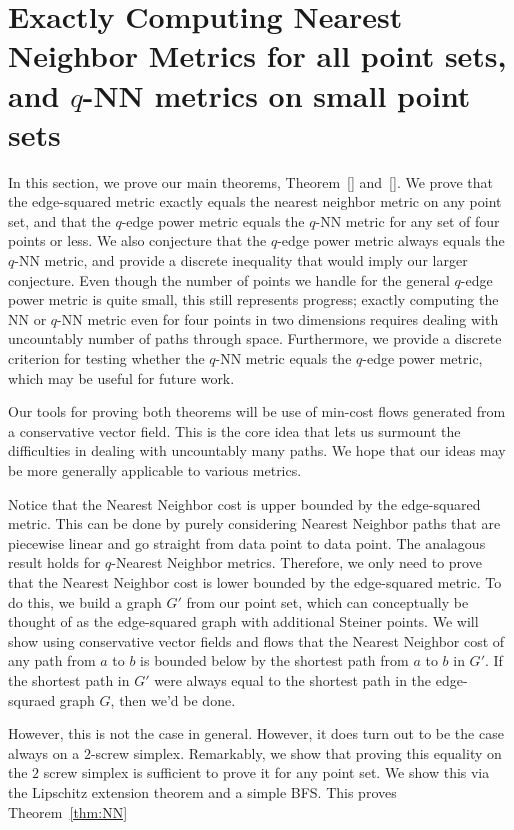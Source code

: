 \section{Exactly Computing Nearest Neighbor Metrics for all point sets, and $q$-NN metrics on
small point sets}\label{sec:metric-equality}

In this section, we prove our main theorems, Theorem~\ref{} and~\ref{}.
We prove that the edge-squared metric exactly equals the nearest neighbor
metric on any point set, and that the $q$-edge power metric equals the $q$-NN
metric for any set of four points or less. We also conjecture that the $q$-edge
power metric always equals the $q$-NN metric, and provide a discrete
inequality that would imply our larger conjecture. Even though the number of points
we handle for the general $q$-edge power metric is quite small, this still
represents progress; exactly computing the NN or $q$-NN metric even for four
points in two dimensions requires dealing with uncountably number of paths
through space. Furthermore, we provide a discrete criterion for testing whether
the $q$-NN metric equals the $q$-edge power metric, which may be useful for
future work.

Our tools for proving both theorems will be use of min-cost flows generated
from a conservative vector field. This is the core idea that lets us surmount
the difficulties in dealing with uncountably many paths. We hope that our ideas
may be more generally applicable to various metrics.  

Notice that the Nearest Neighbor cost is upper bounded by the edge-squared
metric. This can be done by purely considering Nearest Neighbor paths that
are piecewise linear and go straight from data point to data point. The
analagous result holds for $q$-Nearest Neighbor metrics. Therefore, we only
need to prove that the Nearest Neighbor cost is lower bounded by the
edge-squared metric.  
To do this, we build a graph $G'$ from our point set, which can
conceptually be thought of as the edge-squared graph with additional
Steiner points. We will show using conservative vector fields and flows
that the Nearest Neighbor cost of any path from $a$ to $b$ is bounded below
by the shortest path from $a$ to $b$ in $G'$. If the shortest path in $G'$
were always equal to the shortest path in the edge-squraed graph $G$, then
we'd be done.

However, this is not the case in general. However, it does turn out to be
the case always on a $2$-screw simplex. Remarkably, we show that proving
this equality on the $2$ screw simplex is sufficient to prove it for any
point set. We show this via the Lipschitz extension theorem and a simple
BFS. This proves Theorem~\ref{thm:NN}

